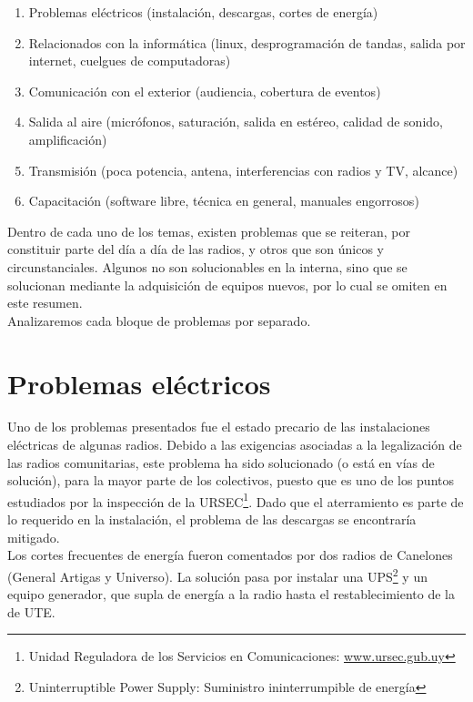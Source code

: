 \begin{enumerate}
  \item Problemas eléctricos (instalación, descargas, cortes de energía)
  \item Relacionados con la informática (linux, desprogramación de tandas, salida por internet, cuelgues de computadoras)
  \item Comunicación con el exterior (audiencia, cobertura de eventos)
  \item Salida al aire (micrófonos, saturación, salida en estéreo, calidad de sonido, amplificación)
  \item Transmisión (poca potencia, antena, interferencias con radios y TV, alcance)
  \item Capacitación (software libre, técnica en general, manuales engorrosos)
\end{enumerate}


Dentro de cada uno de los temas, existen problemas que se reiteran, por constituir parte del día a día de las radios, y otros que son únicos y circunstanciales. Algunos no son solucionables en la interna, sino que se solucionan mediante la adquisición de equipos nuevos, por lo cual se omiten en este resumen.\\

Analizaremos cada bloque de problemas por separado.

\section{Problemas eléctricos}

\indent Uno de los problemas presentados fue el estado precario de las instalaciones eléctricas de algunas radios. Debido a las exigencias asociadas a la legalización de las radios comunitarias, este problema ha sido solucionado (o está en vías de solución), para la mayor parte de los colectivos, puesto que es uno de los puntos estudiados por la inspección de la URSEC\footnote{Unidad Reguladora de los Servicios en Comunicaciones: \href{http://www.ursec.gub.uy}{www.ursec.gub.uy}}. Dado que el aterramiento es parte de lo requerido en la instalación, el problema de las descargas se encontraría mitigado.\\

Los cortes frecuentes de energía fueron comentados por dos radios de Canelones (General Artigas y Universo). La solución pasa por instalar una UPS\footnote{Uninterruptible Power Supply: Suministro ininterrumpible de energía} y un equipo generador, que supla de energía a la radio hasta el restablecimiento de la de UTE.\\

